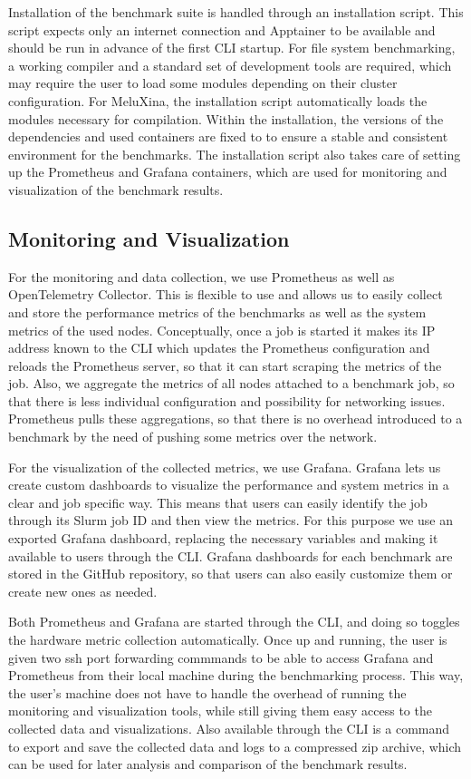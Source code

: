 \documentclass[conference,12pt]{IEEEtran}
\begin{document}
    Installation of the benchmark suite is handled through an installation script.
    This script expects only an internet connection and Apptainer to be available and should be run in advance of the first CLI startup. For file system benchmarking, a working compiler and a standard set of development tools are required, which may require the user to load some modules depending on their cluster configuration. For MeluXina, the installation script automatically loads the modules necessary for compilation.
    Within the installation, the versions of the dependencies and used containers are fixed to to ensure a stable and consistent environment for the benchmarks.
    The installation script also takes care of setting up the Prometheus and Grafana containers, which are used for monitoring and visualization of the benchmark results.

    \subsection{Monitoring and Visualization}
    For the monitoring and data collection, we use Prometheus as well as OpenTelemetry Collector.
    This is flexible to use and allows us to easily collect and store the performance metrics of the benchmarks as well as the system metrics of the used nodes.
    Conceptually, once a job is started it makes its IP address known to the CLI which updates the Prometheus configuration and reloads the Prometheus server, so that it can start scraping the metrics of the job.
    Also, we aggregate the metrics of all nodes attached to a benchmark job, so that there is less individual configuration and possibility for networking issues.
    Prometheus pulls these aggregations, so that there is no overhead introduced to a benchmark by the need of pushing some metrics over the network.

    For the visualization of the collected metrics, we use Grafana.
    Grafana lets us create custom dashboards to visualize the performance and system metrics in a clear and job specific way.
    This means that users can easily identify the job through its Slurm job ID and then view the metrics.
    For this purpose we use an exported Grafana dashboard, replacing the necessary variables and making it available to users through the CLI. Grafana dashboards for each benchmark are stored in the GitHub repository, so that users can also easily customize them or create new ones as needed.

    Both Prometheus and Grafana are started through the CLI, and doing so toggles the hardware metric collection automatically.
    Once up and running, the user is given two ssh port forwarding commmands to be able to access Grafana and Prometheus from their local machine during the benchmarking process. This way, the user's machine does not have to handle the overhead of running the monitoring and visualization tools, while still giving them easy access to the collected data and visualizations.
    Also available through the CLI is a command to export and save the collected data and logs to a compressed zip archive, which can be used for later analysis and comparison of the benchmark results.
\end{document}
